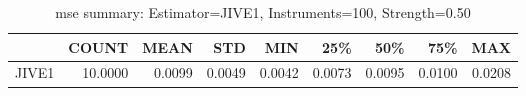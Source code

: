 \begin{table}[ht]
\centering
\caption{mse summary: Estimator=JIVE1, Instruments=100, Strength=0.50}
\begin{tabular}{lrrrrrrrr}
\toprule
 & COUNT & MEAN & STD & MIN & 25\% & 50\% & 75\% & MAX \\
\midrule
JIVE1 & 10.0000 & 0.0099 & 0.0049 & 0.0042 & 0.0073 & 0.0095 & 0.0100 & 0.0208 \\
\bottomrule
\end{tabular}
\end{table}
